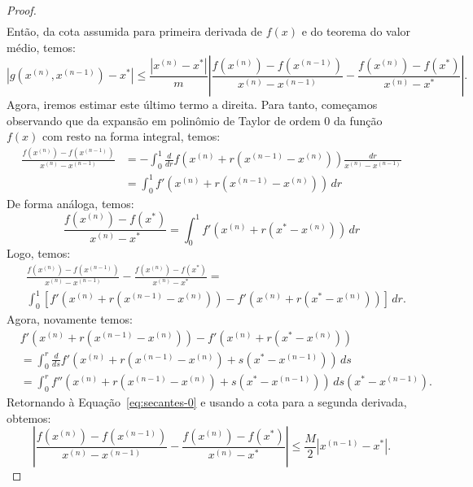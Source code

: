 \begin{ex}
\begin{proof}
\begin{eqnarray}
  \end{eqnarray}
Então, da cota assumida para primeira derivada de $f(x)$ e do teorema do valor médio, temos:
\begin{equation}\label{eq:secantes-est0}
  |g(x^{(n)},x^{(n-1)}) - x^*| \leq \frac{|x^{(n)} - x^*|}{m}\left|\frac{f(x^{(n)}) - f(x^{(n-1)})}{x^{(n)} - x^{(n-1)}} - \frac{f(x^{(n)}) - f(x^*)}{x^{(n)} - x^*}\right|.
\end{equation}
Agora, iremos estimar este último termo a direita. Para tanto, começamos observando que da expansão em polinômio de Taylor de ordem $0$ da função $f(x)$ com resto na forma integral, temos:
\begin{eqnarray}
  \frac{f(x^{(n)}) - f(x^{(n-1)})}{x^{(n)} - x^{(n-1)}} &= -\int_0^1 \frac{d}{dr}f(x^{(n)} + r(x^{(n-1)} - x^{(n)}))\frac{dr}{x^{(n)} - x^{(n-1)}}\\
  &= \int_0^1 f'(x^{(n)} + r(x^{(n-1)} - x^{(n)}))\,dr
\end{eqnarray}
De forma análoga, temos:
\begin{equation}
  \frac{f(x^{(n)}) - f(x^*)}{x^{(n)} - x^*} = \int_0^1 f'(x^{(n)} + r(x^* - x^{(n)}))\,dr
\end{equation}
Logo, temos:
\begin{equation}\label{eq:secantes-0}
  \begin{split}
  &\frac{f(x^{(n)}) - f(x^{(n-1)})}{x^{(n)} - x^{(n-1)}} - \frac{f(x^{(n)}) - f(x^*)}{x^{(n)} - x^*} = \\
  &\int_0^1 \left[f'(x^{(n)} + r(x^{(n-1)} - x^{(n)})) - f'(x^{(n)} + r(x^* - x^{(n)}))\right]\,dr.
  \end{split}
\end{equation}
Agora, novamente temos:
\begin{equation}
  \begin{split}
  &f'(x^{(n)} + r(x^{(n-1)} - x^{(n)})) - f'(x^{(n)} + r(x^* - x^{(n)}))\\
  &= \int_0^r \frac{d}{ds}f'(x^{(n)} + r(x^{(n-1)} - x^{(n)}) + s(x^* - x^{(n-1)}))\,ds\\
  &= \int_0^r f''(x^{(n)} + r(x^{(n-1)} - x^{(n)}) + s(x^* - x^{(n-1)}))\,ds(x^* - x^{(n-1)}).
  \end{split}
\end{equation}
Retornando à Equação~\eqref{eq:secantes-0} e usando a cota para a segunda derivada, obtemos:
\begin{equation}
  \left|\frac{f(x^{(n)}) - f(x^{(n-1)})}{x^{(n)} - x^{(n-1)}} - \frac{f(x^{(n)}) - f(x^*)}{x^{(n)} - x^*} \right| \leq \frac{M}{2}|x^{(n-1)} - x^*|.

\end{equation}
\end{proof}
\end{ex}
